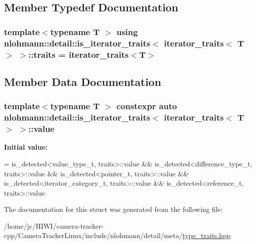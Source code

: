 \subsection{Member Typedef Documentation}
\subsubsection[{\texorpdfstring{traits}{traits}}]{\setlength{\rightskip}{0pt plus 5cm}template$<$typename T $>$ using {\bf nlohmann\+::detail\+::is\+\_\+iterator\+\_\+traits}$<$ {\bf iterator\+\_\+traits}$<$ T $>$ $>$\+::{\bf traits} =  {\bf iterator\+\_\+traits}$<$T$>$\hspace{0.3cm}{\ttfamily [private]}}\hypertarget{structnlohmann_1_1detail_1_1is__iterator__traits_3_01iterator__traits_3_01_t_01_4_01_4_a1cbceaaa83a3ad294c3cb66b9df48e78}{}\label{structnlohmann_1_1detail_1_1is__iterator__traits_3_01iterator__traits_3_01_t_01_4_01_4_a1cbceaaa83a3ad294c3cb66b9df48e78}


\subsection{Member Data Documentation}
\subsubsection[{\texorpdfstring{value}{value}}]{\setlength{\rightskip}{0pt plus 5cm}template$<$typename T $>$ constexpr auto {\bf nlohmann\+::detail\+::is\+\_\+iterator\+\_\+traits}$<$ {\bf iterator\+\_\+traits}$<$ T $>$ $>$\+::value\hspace{0.3cm}{\ttfamily [static]}}\hypertarget{structnlohmann_1_1detail_1_1is__iterator__traits_3_01iterator__traits_3_01_t_01_4_01_4_ac2711760b352b8921accc6609957dc90}{}\label{structnlohmann_1_1detail_1_1is__iterator__traits_3_01iterator__traits_3_01_t_01_4_01_4_ac2711760b352b8921accc6609957dc90}
{\bfseries Initial value\+:}
\begin{DoxyCode}
=
        is\_detected<value\_type\_t, traits>::value &&
        is\_detected<difference\_type\_t, traits>::value &&
        is\_detected<pointer\_t, traits>::value &&
        is\_detected<iterator\_category\_t, traits>::value &&
        is\_detected<reference\_t, traits>::value
\end{DoxyCode}


The documentation for this struct was generated from the following file\+:\begin{DoxyCompactItemize}
\item 
/home/jc/\+H\+I\+W\+I/camera-\/tracker-\/cpp/\+Camera\+Tracker\+Linux/include/nlohmann/detail/meta/\hyperlink{type__traits_8hpp}{type\+\_\+traits.\+hpp}\end{DoxyCompactItemize}

